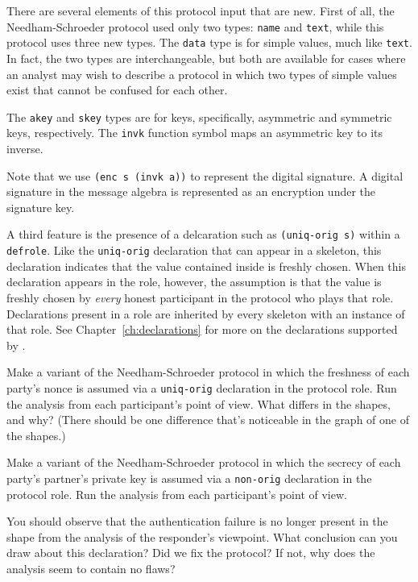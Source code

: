    There are several
elements of this protocol input that are new.  First of all, the
Needham-Schroeder protocol used only two types: \texttt{name} and
\texttt{text}, while this protocol uses three new types.  The
\texttt{data} type is for simple values, much like \texttt{text}.  In
fact, the two types are interchangeable, but both are available for
cases where an analyst may wish to describe a protocol in which two
types of simple values exist that cannot be confused for each other.

The \texttt{akey} and \texttt{skey} types are for keys, specifically,
asymmetric and symmetric keys, respectively.  The \texttt{invk}
function symbol maps an asymmetric key to its inverse.

 Note that we use \texttt{(enc s (invk a))} to
represent the digital signature.  A digital signature in the {\cpsa}
message algebra is represented as an encryption under the signature
key.

 A third feature is the presence of a
delcaration such as \texttt{(uniq-orig s)} within a
\texttt{defrole}.  Like the \texttt{uniq-orig} declaration that can
appear in a skeleton, this declaration indicates that the value
contained inside is freshly chosen.  When this declaration appears in
the role, however, the assumption is that the value is freshly chosen
by \emph{every} honest participant in the protocol who plays that
role.  Declarations present in a role are inherited by every skeleton
with an instance of that role.  See Chapter~\ref{ch:declarations} for
more on the declarations supported by \cpsa.

\begin{exercise}
Make a variant of the Needham-Schroeder protocol in which the
freshness of each party's nonce is assumed via a \texttt{uniq-orig}
declaration in the protocol role.  Run the analysis from each
participant's point of view.  What differs in the shapes, and why?
(There should be one difference that's noticeable in the graph of one
of the shapes.)
\end{exercise}

\begin{exercise}
Make a variant of the Needham-Schroeder protocol in which the secrecy
of each party's partner's private key is assumed via a
\texttt{non-orig} declaration in the protocol role.  Run the analysis
from each participant's point of view.

You should observe that the authentication failure is no longer
present in the shape from the analysis of the responder's viewpoint.
What conclusion can you draw about this declaration?  Did we fix the
protocol?  If not, why does the analysis seem to contain no flaws?
\end{exercise}

